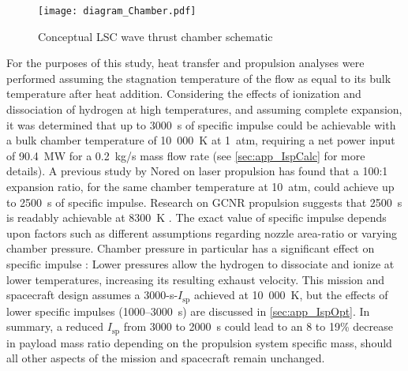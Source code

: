 \documentclass[final,3p,times,twocolumn,sort&compress, lefttitle]{elsarticle}
\begin{document}
                \begin{figure}[t]
                    \centering
                    \texttt{[image: diagram\_Chamber.pdf]}
                    \caption{Conceptual LSC wave thrust chamber schematic}
                    \label{fig:thrustChamber}
                \end{figure}
                For the purposes of this study, heat transfer and propulsion analyses were performed assuming the stagnation temperature of the flow as equal to its bulk temperature after heat addition. Considering the effects of ionization and dissociation of hydrogen at high temperatures, and assuming complete expansion, it was determined that up to 3000~s of specific impulse could be achievable with a bulk chamber temperature of 10~000~K at 1~atm, requiring a net power input of 90.4~MW for a 0.2~kg/s mass flow rate (see \ref{sec:app_IspCalc} for more details). A previous study by Nored \cite{nored_application_1976} on laser propulsion has found that a 100:1 expansion ratio, for the same chamber temperature at 10~atm, could achieve up to 2500~s of specific impulse. Research on GCNR propulsion suggests that 2500~s is readably achievable at 8300~K \cite{ragsdale_high_1971}. The exact value of specific impulse depends upon factors such as different assumptions regarding nozzle area-ratio or varying chamber pressure. Chamber pressure in particular has a significant effect on specific impulse \cite{watson_nuclear_1994}: Lower pressures allow the hydrogen to dissociate and ionize at lower temperatures, increasing its resulting exhaust velocity. This mission and spacecraft design assumes a 3000-s-$I_\mathrm{sp}$ achieved at 10~000~K, but the effects of lower specific impulses (1000--3000~s) are discussed in \ref{sec:app_IspOpt}. In summary, a reduced $I_\mathrm{sp}$ from 3000 to 2000~s could lead to an 8 to 19\% decrease in payload mass ratio depending on the propulsion system specific mass, should all other aspects of the mission and spacecraft remain unchanged.
            
\end{document}
